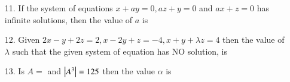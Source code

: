 \documentclass[journal,12pt,twocolumn]{IEEEtran}
\theoremstyle{remark}
\begin{document}
\begin{enumerate}
\begin{enumerate}[label =(\alph*)]
		\end{enumerate}
	

	\item[11.] If the system of equations $x + ay = 0, az + y =0$ and $ax + z =0$ has infinite solutions, then the value of $a$ is 
		\hfill{}
		\begin{enumerate}[label =(\alph*)]
		\end{enumerate}
	

	\item[12.]  Given $2x-y+2z=2,x-2y+z=-4,x+y+\lambda z=4$ then the value of $\lambda$ such that the given system of equation has NO solution, is
	
		\hfill{}
		\begin{enumerate}[label =(\alph*)]
		\end{enumerate}
	\item[13.] Is $A=$  and $\left\vert A^3\right\vert=125$ then the value $\alpha$ is
		\hfill{}
		\begin{enumerate}[label =(\alph*)]
		\end{enumerate}
	


\end{enumerate}
\end{document}
